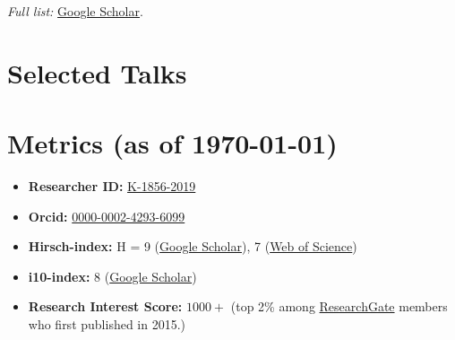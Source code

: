 \documentclass[10pt,a4paper,colorlinks,linkcolor=blue,urlcolor=blue]{moderncv}
\begin{document}
\textit{Full list:} \href{https://scholar.google.com/citations?user=tHb_qZoAAAAJ&hl=en}{Google Scholar}.

\section{Selected Talks}

\section{Metrics (as of \today)}
\begin{itemize}[leftmargin=1.5em]
\item \faIdCard\hspace{0.3em}\textbf{Researcher ID:} \href{https://www.webofscience.com/wos/author/record/K-1856-2019}{K-1856-2019}
\item \faOrcid\hspace{0.3em}\textbf{Orcid:} \href{https://orcid.org/0000-0002-4293-6099}{0000-0002-4293-6099}
\item \faChartLine\hspace{0.3em}\textbf{Hirsch-index:} H = 9 (\href{https://scholar.google.com/citations?hl=en&user=tHb_qZoAAAAJ}{Google Scholar}), 7 (\href{https://www.webofscience.com/wos/author/record/K-1856-2019}{Web of Science})
\item \faFile\hspace{0.3em}\textbf{i10-index:} 8 (\href{https://scholar.google.com/citations?hl=en&user=tHb_qZoAAAAJ}{Google Scholar})
\item \faUsers\hspace{0.3em}\textbf{Research Interest Score:} $1000+$ (top 2\% among \href{https://www.researchgate.net/profile/Vatsal-Sanjay-2}{ResearchGate} members who first published in 2015.)
\end{itemize}
\end{document}
